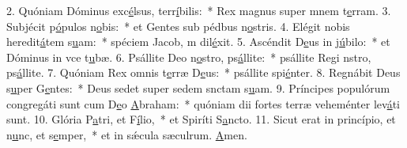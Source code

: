 2. Quóniam Dóminus exc\uline{é}lsus, terr\uline{í}bilis:~* Rex magnus super mnem t\uline{e}rram.
3. Subjécit p\uline{ó}pulos n\uline{o}bis:~* et Gentes sub pédbus n\uline{o}stris.
4. Elégit nobis heredit\uline{á}tem s\uline{u}am:~* spéciem Jacob, m dil\uline{é}xit.
5. Ascéndit D\uline{e}us in j\uline{ú}bilo:~* et Dóminus in vce t\uline{u}bæ.
6. Psállite Deo n\uline{o}stro, ps\uline{á}llite:~* psállite Regi nstro, ps\uline{á}llite.
7. Quóniam Rex omnis t\uline{e}rræ D\uline{e}us:~* psállite spi\uline{é}nter.
8. Regnábit Deus s\uline{u}per G\uline{e}ntes:~* Deus sedet super sedem snctam s\uline{u}am.
9. Príncipes populórum congregáti sunt cum D\uline{e}o \uline{A}braham:~* quóniam dii fortes terræ veheménter lev\uline{á}ti sunt.
10. Glória P\uline{a}tri, et F\uline{í}lio,~* et Spiríti S\uline{a}ncto.
11. Sicut erat in princípio, et n\uline{u}nc, et s\uline{e}mper,~* et in sǽcula sæculrum. \uline{A}men.
